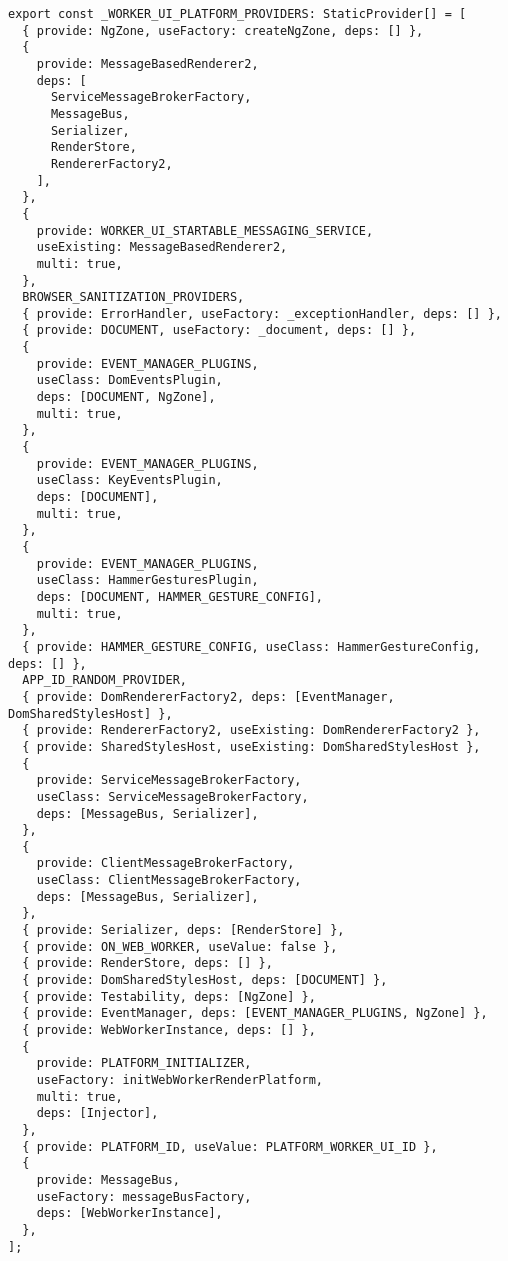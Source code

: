 \begin{verbatim}
export const _WORKER_UI_PLATFORM_PROVIDERS: StaticProvider[] = [
  { provide: NgZone, useFactory: createNgZone, deps: [] },
  {
    provide: MessageBasedRenderer2,
    deps: [
      ServiceMessageBrokerFactory,
      MessageBus,
      Serializer,
      RenderStore,
      RendererFactory2,
    ],
  },
  {
    provide: WORKER_UI_STARTABLE_MESSAGING_SERVICE,
    useExisting: MessageBasedRenderer2,
    multi: true,
  },
  BROWSER_SANITIZATION_PROVIDERS,
  { provide: ErrorHandler, useFactory: _exceptionHandler, deps: [] },
  { provide: DOCUMENT, useFactory: _document, deps: [] },
  {
    provide: EVENT_MANAGER_PLUGINS,
    useClass: DomEventsPlugin,
    deps: [DOCUMENT, NgZone],
    multi: true,
  },
  {
    provide: EVENT_MANAGER_PLUGINS,
    useClass: KeyEventsPlugin,
    deps: [DOCUMENT],
    multi: true,
  },
  {
    provide: EVENT_MANAGER_PLUGINS,
    useClass: HammerGesturesPlugin,
    deps: [DOCUMENT, HAMMER_GESTURE_CONFIG],
    multi: true,
  },
  { provide: HAMMER_GESTURE_CONFIG, useClass: HammerGestureConfig, deps: [] },
  APP_ID_RANDOM_PROVIDER,
  { provide: DomRendererFactory2, deps: [EventManager, DomSharedStylesHost] },
  { provide: RendererFactory2, useExisting: DomRendererFactory2 },
  { provide: SharedStylesHost, useExisting: DomSharedStylesHost },
  {
    provide: ServiceMessageBrokerFactory,
    useClass: ServiceMessageBrokerFactory,
    deps: [MessageBus, Serializer],
  },
  {
    provide: ClientMessageBrokerFactory,
    useClass: ClientMessageBrokerFactory,
    deps: [MessageBus, Serializer],
  },
  { provide: Serializer, deps: [RenderStore] },
  { provide: ON_WEB_WORKER, useValue: false },
  { provide: RenderStore, deps: [] },
  { provide: DomSharedStylesHost, deps: [DOCUMENT] },
  { provide: Testability, deps: [NgZone] },
  { provide: EventManager, deps: [EVENT_MANAGER_PLUGINS, NgZone] },
  { provide: WebWorkerInstance, deps: [] },
  {
    provide: PLATFORM_INITIALIZER,
    useFactory: initWebWorkerRenderPlatform,
    multi: true,
    deps: [Injector],
  },
  { provide: PLATFORM_ID, useValue: PLATFORM_WORKER_UI_ID },
  {
    provide: MessageBus,
    useFactory: messageBusFactory,
    deps: [WebWorkerInstance],
  },
];
\end{verbatim}
